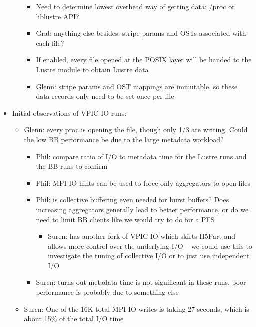 \documentclass[conference,10pt,compsocconf]{IEEEtran}
\begin{document}
\begin{itemize}
\begin{itemize}
        \begin{itemize}
        \item Need to determine lowest overhead way of getting data: /proc or liblustre API?
        \item Grab anything else besides: stripe params and OSTs associated with each file?
        \item If enabled, every file opened at the POSIX layer will be handed to the Lustre
              module to obtain Lustre data
        \item Glenn: stripe params and OST mappings are immutable, so these data records
              only need to be set once per file
        \end{itemize}
    \end{itemize}
\item Initial observations of VPIC-IO runs:
    \begin{itemize}
    \item Glenn: every proc is opening the file, though only 1/3 are writing. Could the
          low BB performance be due to the large metadata workload?
        \begin{itemize}
        \item Phil: compare ratio of I/O to metadata time for the Lustre runs and the BB
              runs to confirm
        \item Phil: MPI-IO hints can be used to force only aggregators to open files
        \item Phil: is collective buffering even needed for burst buffers? Does increasing
              aggregators generally lead to better performance, or do we need to limit BB
              clients like we would try to do for a PFS
            \begin{itemize}
            \item Suren: has another fork of VPIC-IO which skirts H5Part and allows more control
                  over the underlying I/O -- we could use this to investigate the tuning of
                  collective I/O or to just use independent I/O
            \end{itemize}
        \item Suren: turns out metadata time is not significant in these runs, poor performance
              is probably due to something else
        \end{itemize}
    \item Suren: One of the 16K total MPI-IO writes is taking 27 seconds, which is about 15\%
          of the total I/O time

\end{itemize}
\end{itemize}
\end{document}
